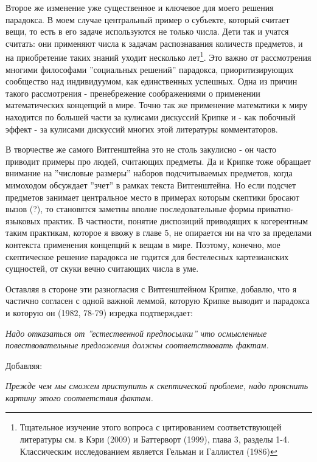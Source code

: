 \documentclass{book}
\begin{document}
Второе же изменение уже существенное и ключевое для моего решения парадокса. В моем случае центральный пример о субъекте, который считает вещи, то есть в его задаче используются не только числа. Дети так и учатся считать: они применяют числа к задачам распознавания количеств предметов, и на приобретение таких знаний уходит несколько лет\footnote{Тщательное изучение этого вопроса с цитированием соответствующей литературы см. в Кэри (2009) и Баттерворт (1999), глава 3, разделы 1-4. Классическим исследованием является Гельман и Галлистел (1986)}. Это важно от рассмотрения многими философами ''социальных решений'' парадокса, приоритизирующих сообщество над индивидуумом, как единственных успешных. Одна из причин такого рассмотрения - пренебрежение соображениями о применении математических концепций в мире. Точно так же применение математики к миру находится по большей части за кулисами дискуссий Крипке и - как побочный эффект - за кулисами дискуссий многих этой литературы комментаторов.

В творчестве же самого Витгенштейна это не столь закулисно - он часто приводит примеры про людей, считающих предметы. Да и Крипке тоже обращает внимание на ''числовые размеры'' наборов подсчитываемых предметов, когда мимоходом обсуждает ''зчет'' в рамках текста Витгенштейна. Но если подсчет предметов занимает центральное место в примерах которым скептики бросают вызов (?), то становятся заметны вполне последовательные формы приватно-языковых практик. В частности, понятие диспозиций приводящих к когерентным таким практикам, которое я ввожу в главе 5, не опирается ни на что за пределами контекста применения концепций к вещам в мире. Поэтому, конечно, мое скептическое решение парадокса не годится для бестелесных картезианских сущностей, от скуки вечно считающих числа в уме.

Оставляя в стороне эти разногласия с Витгенштейном Крипке, добавлю, что я частично согласен с одной важной леммой, которую Крипке выводит и парадокса и которую он (1982, 78-79) изредка подтверждает:

\smallskip

\textit{Надо отказаться от ''естественной предпосылки'' что осмысленные повествовательные предложения должны соответствовать фактам.}

\smallskip

Добавляя:

\smallskip

\textit{Прежде чем мы сможем приступить к скептической проблеме, надо прояснить картину этого соответствия фактам.}
\end{document}
